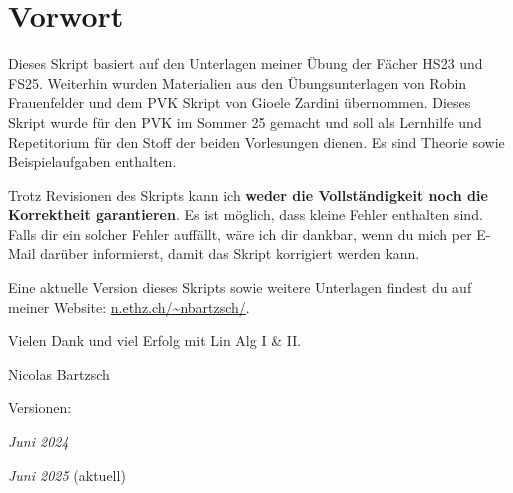 \setcounter{section}{-1}
\section{Vorwort}
Dieses Skript basiert auf den Unterlagen meiner Übung der Fächer  HS23 und  FS25. Weiterhin wurden Materialien aus den Übungsunterlagen von Robin Frauenfelder und dem PVK Skript von Gioele Zardini übernommen. Dieses Skript wurde für den PVK im Sommer 25 gemacht und soll als Lernhilfe und Repetitorium für den Stoff der beiden Vorlesungen dienen. Es sind Theorie sowie Beispielaufgaben enthalten.

\vspace{1\baselineskip}

Trotz Revisionen des Skripts kann ich \textbf{weder die Vollständigkeit noch die Korrektheit garantieren}. Es ist möglich, dass kleine Fehler enthalten sind. Falls dir ein solcher Fehler auffällt, wäre ich dir dankbar, wenn du mich per E-Mail darüber informierst, damit das Skript korrigiert werden kann.

\vspace{1\baselineskip}

Eine aktuelle Version dieses Skripts sowie weitere Unterlagen findest du auf meiner Website: \url{n.ethz.ch/~nbartzsch/}.

\vspace{1\baselineskip}

Vielen Dank und viel Erfolg mit Lin Alg I \& II.

\vspace{2\baselineskip}

Nicolas Bartzsch 

\vspace{4\baselineskip}

Versionen:

\hspace{1em} \textit{Juni 2024}

\hspace{1em} \textit{Juni 2025} (aktuell)

    